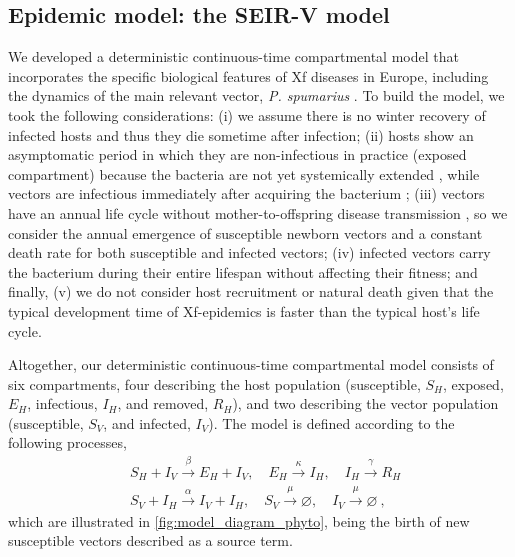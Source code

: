 \subsection{Epidemic model: the SEIR-V model}

We developed a deterministic continuous-time compartmental model that
incorporates the specific biological features of Xf diseases in Europe,
including the dynamics of the main relevant vector, \textit{P. spumarius}
\cite{Cavalieri2019}. To build the model, we took the following
considerations: (i) we assume there is no winter recovery of infected hosts and
thus they die sometime after infection; (ii) hosts show an asymptomatic period
in which they are non-infectious in practice (exposed compartment) because the
bacteria are not yet systemically extended
\cite{teviotdale2003almond,Stevenson238}, while vectors are infectious
immediately after acquiring the bacterium \cite{Fierro2019}; (iii) vectors
have an annual life cycle without mother-to-offspring disease transmission
\cite{freitag1951host,purcell1979evidence}, so we consider the annual
emergence of susceptible newborn vectors and a constant death rate for both
susceptible and infected vectors; (iv) infected vectors carry the bacterium
during their entire lifespan without affecting their fitness; and finally, (v)
we do not consider host recruitment or natural death given that the typical
development time of Xf-epidemics is faster than the typical host's life cycle.

Altogether, our deterministic continuous-time compartmental model consists
of six compartments, four describing the host population (susceptible, $S_H$,
exposed, $E_H$, infectious, $I_H$, and removed, $R_H$), and two describing the
vector population (susceptible, $S_V$, and infected, $I_V$). The model is
defined according to the following processes,
\begin{equation}\label{eq:scheme_infection_phyto}
    \begin{aligned}
         & S_H+I_V \stackrel{\beta}{\rightarrow} E_H + I_V, \quad
        E_H \stackrel{\kappa}{\rightarrow} I_H, \quad
        I_H  \stackrel{\gamma}{\rightarrow} R_H                      \\
         & S_V+I_H \stackrel{\alpha}{\rightarrow} I_V+I_H, \quad S_V
        \stackrel{\mu}{\rightarrow} \varnothing, \quad I_V
        \stackrel{\mu}{\rightarrow}
        \varnothing
        \ ,
    \end{aligned}
\end{equation}
which are illustrated in \cref{fig:model_diagram_phyto}, being the birth of new
susceptible vectors described as a source term.

